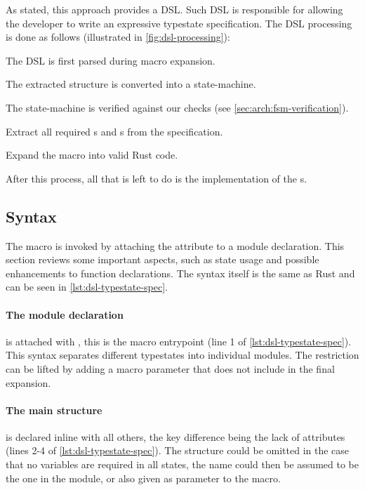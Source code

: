 As stated, this approach provides a DSL.
Such DSL is responsible for allowing the developer to write an expressive typestate specification.
The DSL processing is done as follows (illustrated in \autoref{fig:dsl-processing}):
\begin{compactenum}
    \item The DSL is first parsed during macro expansion.
    \item The extracted structure is converted into a state-machine.
    \item The state-machine is verified against our checks (see \autoref{sec:arch:fsm-verification}).
    \item Extract all required s and s from the specification.
    \item Expand the macro into valid Rust code.
\end{compactenum}
After this process, all that is left to do is the implementation of the s.



\subsection{Syntax}\label{sec:arch:syntax}

The macro is invoked by attaching the \keyword{\#[typestate]} attribute to a module declaration.
This section reviews some important aspects, such as state usage and possible enhancements to function declarations.
The syntax itself is the same as Rust and can be seen in \autoref{lst:dsl-typestate-spec}.

\paragraph{The module declaration} is attached with \keyword{\#[typestate]}, this is the macro entrypoint (line 1 of \autoref{lst:dsl-typestate-spec}).
This syntax separates different typestates into individual modules.
The restriction can be lifted by adding a macro parameter that does not include  in the final expansion.

\paragraph{The main structure} is declared inline with all others, the key difference being the lack of attributes (lines 2-4 of \autoref{lst:dsl-typestate-spec}).
The structure could be omitted in the case that no variables are required in all states,
the name could then be assumed to be the one in the module, or also given as parameter to the macro.

